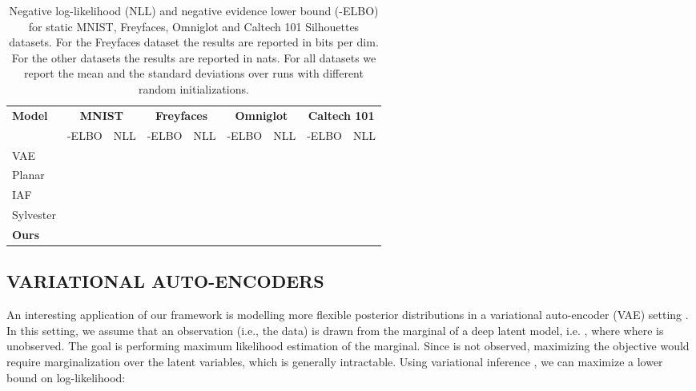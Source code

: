 \documentclass[letterpaper]{article}
\begin{document}
\begin{table*}[ht]
\centering
\caption{Negative log-likelihood (NLL) and negative evidence lower bound (-ELBO) for static MNIST, Freyfaces, Omniglot and Caltech 101 Silhouettes datasets. For the Freyfaces dataset the results are reported in bits per dim. For the other datasets the results are reported in nats. For all datasets we report the mean and the standard deviations over  runs with different random initializations.}

\begin{tabular}{lcccccccc}
\toprule
\multirow{2}{*}{\bfseries{Model}} & \multicolumn{2}{c}{\bfseries MNIST} & \multicolumn{2}{c}{\bfseries Freyfaces} & \multicolumn{2}{c}{\bfseries Omniglot} & \multicolumn{2}{c}{\bfseries Caltech 101} \\
& \multicolumn{1}{c}{-ELBO} & \multicolumn{1}{c}{NLL} & \multicolumn{1}{c}{-ELBO} & \multicolumn{1}{c}{NLL} & \multicolumn{1}{c}{-ELBO} &\multicolumn{1}{c}{NLL} & \multicolumn{1}{c}{-ELBO} &\multicolumn{1}{c}{NLL} \\
\midrule
VAE & {\tiny} & {\tiny} & {\tiny} & {\tiny} & {\tiny} & {\tiny} & {\tiny} & {\tiny} \\
Planar & {\tiny} & {\tiny} & {\tiny} & {\tiny} & {\tiny} & {\tiny} & {\tiny} & {\tiny}\\
IAF & {\tiny} & {\tiny} & {\tiny} & {\tiny} & {\tiny} & {\tiny} & {\tiny} & {\tiny}\\
Sylvester & {\tiny} & {\tiny} & {\tiny} & {\tiny}& {\tiny} & {\tiny} & {\tiny} & {\tiny}\\
\midrule
\textbf{Ours} & {\tiny} & {\tiny} & {\tiny} & {\tiny} & {\tiny} & {\tiny} & {\tiny} & {\tiny} \\
\bottomrule
\end{tabular}
\label{tab:vae}
\end{table*}

\subsection{VARIATIONAL AUTO-ENCODERS} \label{sec:vae}
An interesting application of our framework is modelling more flexible posterior distributions in a variational auto-encoder (VAE) setting \citep{kingma2013auto}. In this setting, we assume that an observation  (i.e., the data) is drawn from the marginal of a deep latent model, i.e. , where  where  is unobserved. The goal is performing maximum likelihood estimation of the marginal. Since  is not observed, maximizing the objective would require marginalization over the latent variables, which is generally intractable. Using variational inference \citep{jordan1999introduction}, we can maximize a lower bound on log-likelihood:
\end{document}
